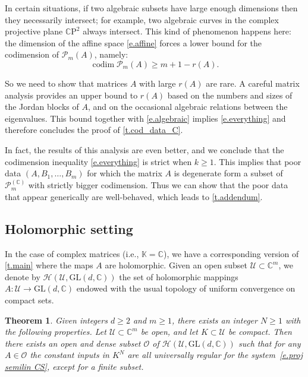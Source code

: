 \documentclass[10pt, a4paper]{amsart}
\theoremstyle{plain}
\newtheorem{thm}[lemma]{Theorem}
\theoremstyle{definition}
\theoremstyle{remark}
\theoremstyle{note}
\numberwithin{equation}{section}
\begin{document}
In certain situations,  if two algebraic subsets have large enough dimensions 
then they necessarily intersect;
for example, two algebraic curves in the complex projective plane ${\mathbb{C}\mathrm{P}}^2$ always intersect.
This kind of phenomenon happens here:
the dimension of the affine space \eqref{e.affine} 
forces a lower bound for the codimension of ${\mathcal{P}}_m(A)$, namely:
\begin{equation}\label{e.algebraic}
\operatorname{codim} {\mathcal{P}}_m(A) \ge m+1-r(A).
\end{equation}

So 
we need to show that matrices $A$ with large $r(A)$ are rare.
A careful matrix analysis provides
an upper bound to $r(A)$ based on the numbers and sizes of the Jordan blocks of $A$,
and on the occasional algebraic relations between the eigenvalues.
This bound together with \eqref{e.algebraic}
implies \eqref{e.everything} and therefore concludes the proof of \cref{t.cod_data_C}.

In fact, the results of this analysis are even better,
and we conclude that the codimension inequality \eqref{e.everything}
is strict when $k \ge 1$.
This implies that poor data $(A, B_1, \dots, B_m)$ 
for which the matrix $A$ is degenerate form a subset of ${\mathcal{P}}_{m}^{({\mathbb{C}})}$ 
with strictly bigger codimension.
Thus we can show that the poor data that appear generically are well-behaved,
which leads to \cref{t.addendum}.

\subsection{Holomorphic setting}

In the case of complex matrices (i.e., ${\mathbb{K}} = {\mathbb{C}}$), we have a 
corresponding version of \cref{t.main} where the maps $A$ are holomorphic.
Given an open subset ${\mathcal{U}} \subset {\mathbb{C}}^m$, we denote by 
$\mathcal{H}({\mathcal{U}}, {\mathrm{GL}}(d,{\mathbb{C}}))$ 
the set of holomorphic mappings $A \colon {\mathcal{U}}\to {\mathrm{GL}}(d,{\mathbb{C}})$ endowed with the usual topology of uniform convergence on compact sets. 

\begin{thm}\label{t.main_C}
Given integers $d\ge 2$ and $m \ge 1$, there exists an integer $N\ge 1$ with the following properties.
Let ${\mathcal{U}}\subset {\mathbb{C}}^m$ be open, and let $K\subset {\mathcal{U}}$ be compact.
Then there exists an open and dense subset ${\mathcal{O}}$ of $\mathcal{H}({\mathcal{U}}, {\mathrm{GL}}(d,{\mathbb{C}}))$
such that for any $A \in {\mathcal{O}}$ the constant inputs in $K^N$ are all universally regular for the  system~\eqref{e.proj semilin CS}, except for a finite subset.
\end{thm}
\end{document}
